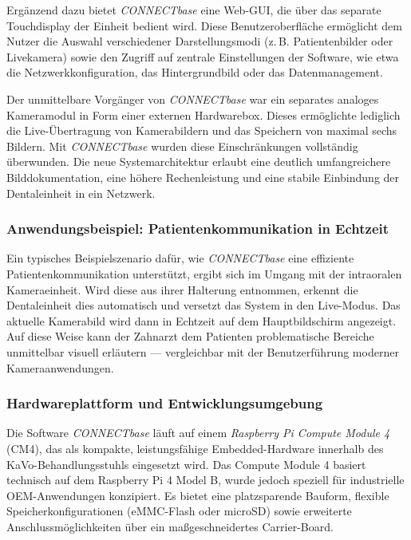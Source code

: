 Ergänzend dazu bietet \textit{CONNECTbase} eine Web-GUI, die über das separate Touchdisplay der Einheit bedient wird. Diese Benutzeroberfläche ermöglicht dem Nutzer die Auswahl verschiedener Darstellungsmodi (z.\,B. Patientenbilder oder Livekamera) sowie den Zugriff auf zentrale Einstellungen der Software, wie etwa die Netzwerkkonfiguration, das Hintergrundbild oder das Datenmanagement.

Der unmittelbare Vorgänger von \textit{CONNECTbase} war ein separates analoges Kameramodul in Form einer externen Hardwarebox. Dieses ermöglichte lediglich die Live-Übertragung von Kamerabildern und das Speichern von maximal sechs Bildern. Mit \textit{CONNECTbase} wurden diese Einschränkungen vollständig überwunden. Die neue Systemarchitektur erlaubt eine deutlich umfangreichere Bilddokumentation, eine höhere Rechenleistung und eine stabile Einbindung der Dentaleinheit in ein Netzwerk.

\subsubsection*{Anwendungsbeispiel: Patientenkommunikation in Echtzeit}

Ein typisches Beispielszenario dafür, wie \textit{CONNECTbase} eine effiziente Patientenkommunikation unterstützt, ergibt sich im Umgang mit der intraoralen Kameraeinheit. Wird diese aus ihrer Halterung entnommen, erkennt die Dentaleinheit dies automatisch und versetzt das System in den Live-Modus. Das aktuelle Kamerabild wird dann in Echtzeit auf dem Hauptbildschirm angezeigt. Auf diese Weise kann der Zahnarzt dem Patienten problematische Bereiche unmittelbar visuell erläutern — vergleichbar mit der Benutzerführung moderner Kameraanwendungen.

\subsubsection{Hardwareplattform und Entwicklungsumgebung}

Die Software \textit{CONNECTbase} läuft auf einem \textit{Raspberry Pi Compute Module 4} (CM4), das als kompakte, leistungsfähige Embedded-Hardware innerhalb des KaVo-Behandlungsstuhls eingesetzt wird. Das Compute Module 4 basiert technisch auf dem Raspberry Pi 4 Model B, wurde jedoch speziell für industrielle OEM-Anwendungen konzipiert. Es bietet eine platzsparende Bauform, flexible Speicherkonfigurationen (eMMC-Flash oder microSD) sowie erweiterte Anschlussmöglichkeiten über ein maßgeschneidertes Carrier-Board.

